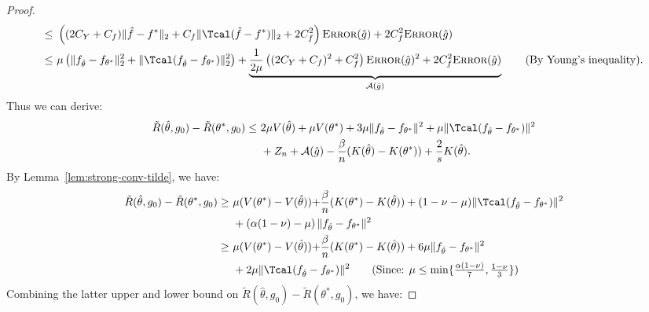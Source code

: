 \documentclass[12pt]{extarticle} %
\newcommand{\error}{\ensuremath{\textsc{Error}}}
\begin{document}
\begin{proof}
\begin{align*}
    \leq~& \left((2C_Y + C_f)\|\hat{f}-f^*\|_{2}+C_f\|\Tcal(\hat{f}-f^*)\|_2 + 2C_f^2\right)\error(\hat{g}) +  2C_f^2\error(\hat{g})\\
    \leq~& \mu\left(\|f_{\hat{\theta}}-f_{\theta^*}\|_{2}^2+\|\Tcal(f_{\hat{\theta}}-f_{\theta^*})\|_2^2\right)+\underbrace{\frac{1}{2\mu}\left((2C_Y+C_f)^2+C_f^2\right)\error(\hat{g})^2 + 2C_f^2\error(\hat{g})}_{{\cal A}(\hat{g})} \tag{By Young's inequality}.
\end{align*}
Thus we can derive:
\begin{align}
    \tilde{R}(\hat{\theta}, g_0) - \tilde{R}(\theta^*, g_0) \leq~& 2\mu V(\hat{\theta}) + \mu V(\theta^*) + 3\mu \|f_{\hat{\theta}} - f_{\theta^*}\|^2 + \mu\|\Tcal(f_{\hat{\theta}}-f_{\theta^*})\|^2\\\label{eqn:first-upper}
    ~&  + Z_n + {\cal A}(\hat{g})  -\frac{\beta}{n}(K(\hat{\theta})-K(\theta^*)) + \frac{2}{s}K(\hat{\theta}).
\end{align}
By Lemma~\ref{lem:strong-conv-tilde}, we have:
\begin{align*}
    \tilde{R}(\hat{\theta}, g_0) - \tilde{R}(\theta^*, g_0) \geq~& \mu (V(\theta^*) - V(\hat{\theta})) {+\frac{\beta}{n}(K(\theta^*)-K(\hat{\theta}))} +(1-\nu-\mu)\|\Tcal(f_{\hat{\theta}} - f_{\theta^*})\|^2\\
    ~&+ \left(\alpha(1-\nu) - \mu\right)\|f_{\hat{\theta}} - f_{\theta^*}\|^2 \\
    \geq~& \mu (V(\theta^*) - V(\hat{\theta})) {+\frac{\beta}{n}(K(\theta^*)-K(\hat{\theta}))} + 6\mu  \|f_{\hat{\theta}} - f_{\theta^*}\|^2 \\
    ~&+ 2\mu\|\Tcal(f_{\hat{\theta}} - f_{\theta^*})\|^2
    \tag{Since: $\mu \leq \min\{\frac{\alpha(1-\nu)}{7},\frac{1-\nu}{3}\}$}
\end{align*}
Combining the latter upper and lower bound on $\tilde{R}(\hat{\theta}, g_0) - \tilde{R}(\theta^*, g_0)$, we have:

\end{proof}
\end{document}
